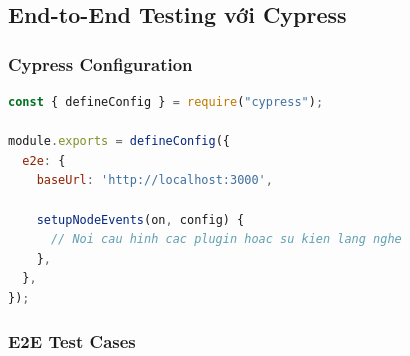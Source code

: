 \subsection{End-to-End Testing với Cypress}

\subsubsection{Cypress Configuration}

\begin{lstlisting}[language=JavaScript, caption=Cypress Configuration]
const { defineConfig } = require("cypress");

module.exports = defineConfig({
  e2e: {
    baseUrl: 'http://localhost:3000',
    
    setupNodeEvents(on, config) {
      // Noi cau hinh cac plugin hoac su kien lang nghe
    },
  },
});
\end{lstlisting}

\subsubsection{E2E Test Cases}

